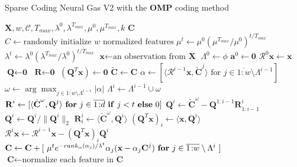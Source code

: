 \documentclass[12pt,a4paper,oneside,english]{UPBThesis}
\newcommand{\hcrange}[2]{\overline{{#1}\colon\!\!{#2}}}
\begin{document}
\begin{algorithm}
\caption{Sparse Coding Neural Gas V2 with the \textbf{OMP} coding method}
\label{algo:SparseCodingNeuralGasV2OMP}
\begin{algorithmic}
\Require $\textbf{X},w,\mathcal{C},T_{max},\lambda^0,\lambda^{T_{max}},\mu^0,\mu^{T_{max}},k$
\Ensure $\textbf{C}$
\State $C \gets \mbox{randomly initialize $w$ normalized features}$
\For {$t = \hcrange{1}{T_{max}}$}
\State $\mu^t \gets \mu^0 (\mu^{T_{max}} / \mu^0)^{t / T_{max}}$  
\State $\lambda^t \gets \lambda^0 (\lambda^{T_{max}} / \lambda^0)^{t / T_{max}}$ 
\State $\textbf{x} \gets \text{an observation from $\textbf{X}$}$
\State $\Lambda^0 \gets \phi$
\State $\textbf{a}^0 \gets \textbf{0}$
\State $\mathcal{R}^0\textbf{x} \gets \textbf{x}$
\State $\textbf{Q} \gets \textbf{0}$
\State $\textbf{R} \gets \textbf{0}$
\State $(\textbf{Q}^T\textbf{x}) \gets \textbf{0}$
\State $\tilde{\textbf{C}} \gets \textbf{C}$
\For {$i = \hcrange{0}{k}$}
\State $\alpha \gets [ \langle \mathcal{R}^{i-1}\textbf{x} , \tilde{\textbf{C}}^j \rangle \mbox{~for $j \in \hcrange{1}{w} \setminus \Lambda^{i-1}$} ]$
\State $\omega \gets \arg \max_{j \in \hcrange{1}{w} \setminus \Lambda^{i-1}} \left| \alpha \right|$
\State $\Lambda^i \gets \Lambda^{i-1} \cup \omega$
\State $\textbf{R}^i \gets [ \langle \tilde{\textbf{C}}^\omega, \textbf{Q}^j \rangle~\mbox{\textbf{for} $j \in \hcrange{1}{d}$ \textbf{if} $j < t$ \textbf{else} $0$} ]$ 
\State $\textbf{Q}^i \gets \tilde{\textbf{C}}^\omega - \textbf{Q}^{\hcrange{1}{i-1}}\textbf{R}^i_{\hcrange{1}{i-1}}$ 
\State $\textbf{Q}^i \gets \textbf{Q}^i / \| \textbf{Q}^i \|_2$ 
\State $\textbf{R}^i_i \gets \langle \tilde{\textbf{C}}^\omega, \textbf{Q}^i \rangle$
\State $(\textbf{Q}^T\textbf{x})_i \gets \langle \textbf{x}, \textbf{Q}^i \rangle$
\State $\mathcal{R}^i\textbf{x} \gets \mathcal{R}^{i-1}\textbf{x} -  (\textbf{Q}^T\textbf{x})_i \textbf{Q}^i$
\State $\textbf{C} \gets \textbf{C} + [ ~ \mu^t e^{-rank_{\alpha}(\alpha_j) / \lambda^t} \alpha_j (\textbf{x} - \alpha_j \textbf{C}^j) ~ \mbox{\textbf{for} $j \in \hcrange{1}{w}\setminus\Lambda^i$} ~ ]$
\State $\textbf{C} \gets \mbox{normalize each feature in $\textbf{C}$}$
\EndFor
\EndFor
\end{algorithmic}
\end{algorithm}
\end{document}
